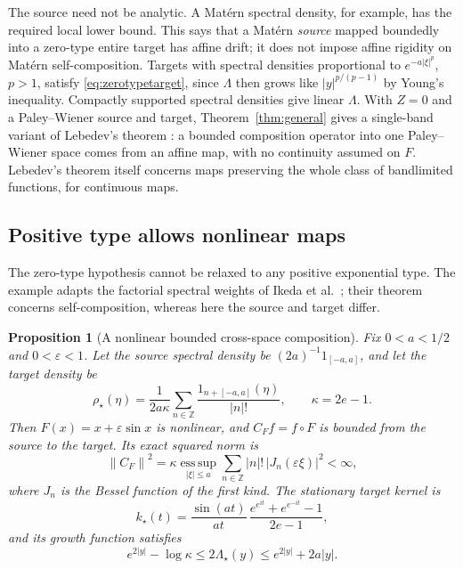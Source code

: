 \documentclass[11pt,a4paper]{article}
\newtheorem{proposition}[theorem]{Proposition}
\theoremstyle{remark}
\newcommand{\norm}[1]{\left\lVert#1\right\rVert}
\newcommand{\esssup}{\operatorname*{ess\,sup}}
\begin{document}
The source need not be analytic. A Mat\'ern spectral density, for
example, has the required local lower bound. This says that a
Mat\'ern \emph{source} mapped boundedly into a zero-type entire
target has affine drift; it does not impose affine rigidity on
Mat\'ern self-composition. Targets with spectral densities proportional
to $e^{-a|\xi|^p}$, $p>1$, satisfy \eqref{eq:zerotypetarget}, since
$\Lambda$ then grows like $|y|^{p/(p-1)}$ by Young's inequality.
Compactly supported spectral densities give linear $\Lambda$. With
$Z=0$ and a Paley--Wiener source and target, Theorem~\ref{thm:general}
gives a single-band variant of Lebedev's theorem \cite{Lebedev2012}: a
bounded composition operator into one Paley--Wiener space comes from an
affine map, with no continuity assumed on $F$. Lebedev's theorem itself
concerns maps preserving the whole class of bandlimited functions, for
continuous maps.

\subsection{Positive type allows nonlinear maps}

The zero-type hypothesis cannot be relaxed to any positive exponential
type. The example adapts the factorial spectral weights of Ikeda et al.\
\cite[Corollary~1]{Ikeda2022}; their theorem concerns self-composition,
whereas here the source and target differ.

\begin{proposition}[A nonlinear bounded cross-space composition]\label{prop:warping}
Fix $0<a<1/2$ and $0<\varepsilon<1$. Let the source spectral
density be $(2a)^{-1}1_{[-a,a]}$, and let the target density be
\[
 \rho_\star(\eta)=
 \frac{1}{2a\kappa}\sum_{n\in\mathbb Z}
          \frac{1_{n+[-a,a]}(\eta)}{|n|!},
 \qquad \kappa=2e-1.
\]
Then $F(x)=x+\varepsilon\sin x$ is nonlinear, and
$C_Ff=f\circ F$ is bounded from the source to the target.
Its exact squared norm is
\begin{equation}\label{eq:besselnorm}
 \norm{C_F}^2=
 \kappa\esssup_{|\xi|\le a}
       \sum_{n\in\mathbb Z}|n|!\,|J_n(\varepsilon\xi)|^2<\infty,
\end{equation}
where $J_n$ is the Bessel function of the first kind.
The stationary target kernel is
\begin{equation}\label{eq:infinitekernel}
 k_\star(t)=\frac{\sin(at)}{at}\,
       \frac{e^{e^{it}}+e^{e^{-it}}-1}{2e-1},
\end{equation}
and its growth function satisfies
\begin{equation}\label{eq:typetwo}
 e^{2|y|}-\log\kappa\le2\Lambda_\star(y)\le e^{2|y|}+2a|y|.
\end{equation}
\end{proposition}
\end{document}
